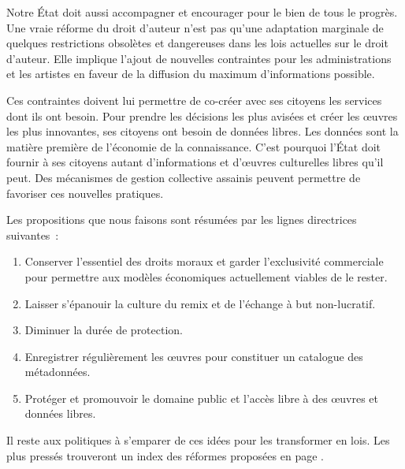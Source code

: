 Notre État doit aussi accompagner et encourager pour le bien de tous le progrès. Une vraie réforme du droit d'auteur n'est pas qu'une adaptation marginale de quelques restrictions obsolètes et dangereuses dans les lois actuelles sur le droit d'auteur. Elle implique l'ajout de nouvelles contraintes pour les administrations et les artistes en faveur de la diffusion du maximum d'informations possible. 

Ces contraintes doivent lui permettre de co-créer avec ses citoyens les services dont ils ont besoin. Pour prendre les décisions les plus avisées et créer les œuvres les plus innovantes, ses citoyens ont besoin de données libres. Les données sont la matière première de l'économie de la connaissance. C'est pourquoi l'État doit fournir à ses citoyens autant d'informations et d'œuvres culturelles libres qu'il peut. Des mécanismes de gestion collective assainis peuvent permettre de favoriser ces nouvelles pratiques.

Les propositions que nous faisons sont résumées par les lignes directrices suivantes~:

\begin{enumerate}
\item Conserver l'essentiel des droits moraux et garder l'exclusivité commerciale pour permettre aux modèles
économiques actuellement viables de le rester.
\item Laisser s'épanouir la culture du remix et de l'échange à but non-lucratif.
\item Diminuer la durée de protection.
\item Enregistrer régulièrement les œuvres pour constituer un catalogue des métadonnées. 
\item Protéger et promouvoir le domaine public et l'accès libre à des œuvres et données libres.
\end{enumerate}

Il reste aux politiques à s'emparer de ces idées pour les transformer en lois. Les plus pressés trouveront un index des réformes proposées en page \pageref{index}.
